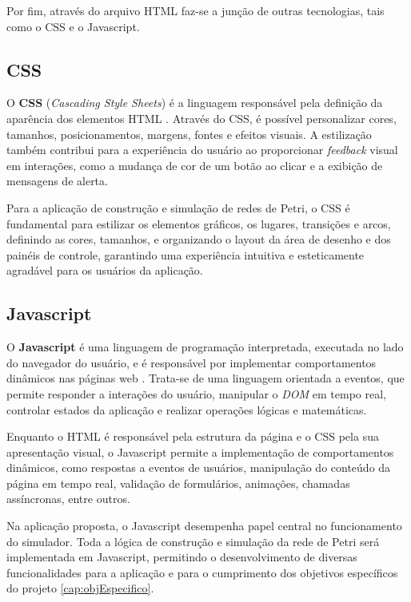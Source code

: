 \documentclass[
	12pt,				%
	openright,			%
	oneside,			%
	a4paper,			%
	english,			%
	brazil				%
	]{abntex2}
\begin{document}
Por fim, através do arquivo HTML faz-se a junção de outras tecnologias, tais como o CSS e o Javascript. 

\subsection*{CSS}

O \textbf{CSS} (\textit{Cascading Style Sheets}) é a linguagem responsável pela definição da aparência dos elementos HTML \cite{mdn_css}. Através do CSS, é possível personalizar cores, tamanhos, posicionamentos, margens, fontes e efeitos visuais. A estilização também contribui para a experiência do usuário ao proporcionar \textit{feedback} visual em interações, como a mudança de cor de um botão ao clicar e a exibição de mensagens de alerta. 

Para a aplicação de construção e simulação de redes de Petri, o CSS é fundamental para estilizar os elementos gráficos, os lugares, transições e arcos, definindo as cores, tamanhos, e organizando o layout da área de desenho e dos painéis de controle, garantindo uma experiência intuitiva e esteticamente agradável para os usuários da aplicação. 

\subsection*{Javascript}

O \textbf{Javascript} é uma linguagem de programação interpretada, executada no lado do navegador do usuário, e é responsável por implementar comportamentos dinâmicos nas páginas web \cite{mdn_css}. Trata-se de uma linguagem orientada a eventos, que permite responder a interações do usuário, manipular o \textit{DOM} em tempo real, controlar estados da aplicação e realizar operações lógicas e matemáticas.

Enquanto o HTML é responsável pela estrutura da página e o CSS pela sua apresentação visual, o Javascript permite a implementação de comportamentos dinâmicos, como respostas a eventos de usuários, manipulação do conteúdo da página em tempo real, validação de formulários, animações, chamadas assíncronas, entre outros. 

Na aplicação proposta, o Javascript desempenha papel central no funcionamento do simulador. Toda a lógica de construção e simulação da rede de Petri será implementada em Javascript, permitindo o desenvolvimento de diversas funcionalidades para a aplicação e para o cumprimento dos objetivos específicos do projeto \ref{cap:objEspecifico}. 
\end{document}
